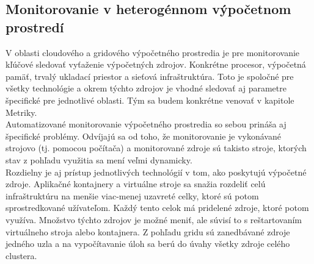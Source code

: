\documentclass[11pt,final,oneside]{fithesis}
\begin{document}
\subsection{Monitorovanie v heterogénnom výpočetnom prostredí}
V oblasti cloudového a gridového výpočetného prostredia je pre monitorovanie kľúčové sledovať vyťaženie výpočetných zdrojov. Konkrétne procesor, výpočetná pamäť, trvalý ukladací priestor a sieťová infraštruktúra. Toto je spoločné
pre všetky technológie a okrem týchto zdrojov je vhodné sledovať aj parametre špecifické pre jednotlivé oblasti. Tým sa budem konkrétne venovať v kapitole Metriky.
\\Automatizované monitorovanie výpočetného prostredia so sebou prináša aj špecifické problémy. Odvíjajú sa od toho, že monitorovanie je vykonávané strojovo (tj. pomocou počítača) a monitorované zdroje sú takisto stroje, ktorých
stav z pohľadu využitia sa mení veľmi dynamicky.
\\Rozdielny je aj prístup jednotlivých technológií v tom, ako poskytujú výpočetné zdroje. Aplikačné kontajnery a virtuálne stroje sa snažia rozdeliť celú infraštruktúru na menšie viac-menej uzavreté celky, ktoré sú potom sprostredkované
užívateľom. Každý tento celok má pridelené zdroje, ktoré potom využíva. Množstvo týchto zdrojov je možné meniť, ale súvisí to s reštartovaním virtuálneho stroja alebo kontajnera. Z pohľadu gridu sú zanedbávané zdroje jedného uzla a na
vypočítavanie úloh sa berú do úvahy všetky zdroje celého clustera. 
\end{document}
